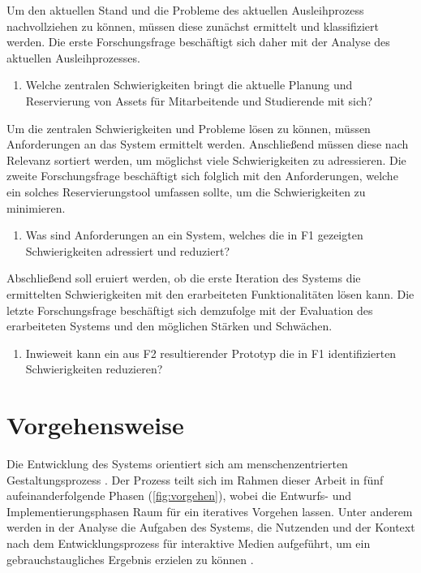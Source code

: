 Um den aktuellen Stand und die Probleme des aktuellen Ausleihprozess
nachvollziehen zu können, müssen diese zunächst ermittelt und klassifiziert
werden. Die erste Forschungsfrage beschäftigt sich daher mit der Analyse des
aktuellen Ausleihprozesses.
\begin{enumerate}
  \item[\sffamily\color{maincolor} {F1 |}] {Welche zentralen Schwierigkeiten bringt die aktuelle Planung und Reservierung von Assets für Mitarbeitende und Studierende mit sich?}
\end{enumerate}
Um die zentralen Schwierigkeiten und Probleme lösen zu können, müssen
Anforderungen an das System ermittelt werden. Anschließend müssen diese nach
Relevanz sortiert werden, um möglichst viele Schwierigkeiten zu adressieren.
Die zweite Forschungsfrage beschäftigt sich folglich mit den Anforderungen,
welche ein solches Reservierungstool umfassen sollte, um die Schwierigkeiten zu
minimieren.
\begin{enumerate}
  \item[\sffamily\color{maincolor} {F2 |}] {Was sind Anforderungen an ein System, welches die in F1 gezeigten Schwierigkeiten adressiert und reduziert?}
\end{enumerate}
Abschließend soll eruiert werden, ob die erste Iteration des Systems die
ermittelten Schwierigkeiten mit den erarbeiteten Funktionalitäten lösen kann.
Die letzte Forschungsfrage beschäftigt sich demzufolge mit der Evaluation des
erarbeiteten Systems und den möglichen Stärken und Schwächen.
\begin{enumerate}
  \item[\sffamily\color{maincolor} {F3 |}] {Inwieweit kann ein aus F2 resultierender Prototyp die in F1 identifizierten Schwierigkeiten reduzieren?}
\end{enumerate}

\section{Vorgehensweise}
Die Entwicklung des Systems orientiert sich am menschenzentrierten
Gestaltungsprozess \cite{DINISO9241}. Der Prozess teilt sich im Rahmen dieser
Arbeit in fünf aufeinanderfolgende Phasen (\ref{fig:vorgehen}), wobei die
Entwurfs- und Implementierungsphasen Raum für ein iteratives Vorgehen
lassen. Unter anderem werden in der Analyse die Aufgaben des Systems, die
Nutzenden und der Kontext nach dem Entwicklungsprozess für interaktive Medien
aufgeführt, um ein gebrauchstaugliches Ergebnis erzielen zu können
\cite{HerczegMDI2009}.

